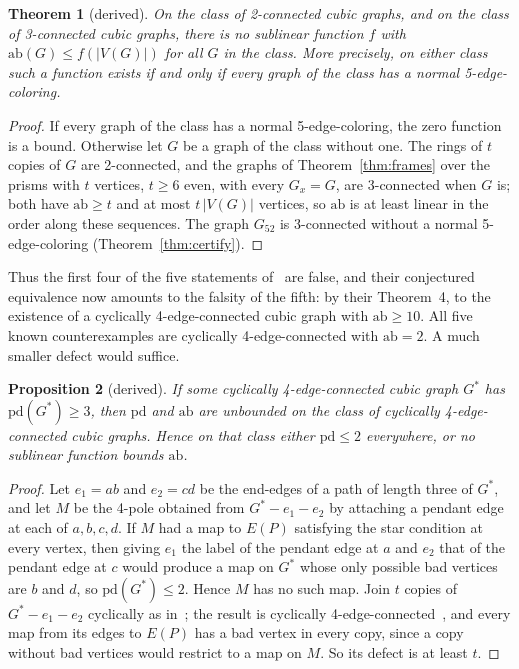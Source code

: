 \documentclass[11pt]{article}
\newtheorem{theorem}{Theorem}[section]
\newtheorem{proposition}[theorem]{Proposition}
\theoremstyle{definition}
\theoremstyle{remark}
\newcommand{\PG}{P}
\newcommand{\Gfty}{G_{52}}
\newcommand{\pd}{\mathrm{pd}}
\newcommand{\ab}{\mathrm{ab}}
\begin{document}
\begin{theorem}[derived]\label{thm:sublinear}
On the class of 2-connected cubic graphs, and on the class of 3-connected cubic graphs, there is
no sublinear function $f$ with $\ab(G) \le f(|V(G)|)$ for all $G$ in the class. More precisely, on
either class such a function exists if and only if every graph of the class has a normal
5-edge-coloring.
\end{theorem}

\begin{proof}
If every graph of the class has a normal 5-edge-coloring, the zero function is a bound. Otherwise
let $G$ be a graph of the class without one. The rings of $t$ copies of $G$ are 2-connected, and
the graphs of Theorem~\ref{thm:frames} over the prisms with $t$ vertices, $t \ge 6$ even, with
every $G_x = G$, are 3-connected when $G$ is; both have $\ab \ge t$ and at most $t\,|V(G)|$
vertices, so $\ab$ is at least linear in the order along these sequences. The graph $\Gfty$ is
3-connected without a normal 5-edge-coloring (Theorem~\ref{thm:certify}).
\end{proof}

Thus the first four of the five statements of~\cite{MMM2021} are false, and their conjectured
equivalence now amounts to the falsity of the fifth: by their Theorem~4, to the existence of a
cyclically 4-edge-connected cubic graph with $\ab \ge 10$. All five known counterexamples are
cyclically 4-edge-connected with $\ab = 2$. A much smaller defect would suffice.

\begin{proposition}[derived]\label{prop:threshold}
If some cyclically 4-edge-connected cubic graph $G^*$ has $\pd(G^*) \ge 3$, then $\pd$ and $\ab$
are unbounded on the class of cyclically 4-edge-connected cubic graphs. Hence on that class either
$\pd \le 2$ everywhere, or no sublinear function bounds $\ab$.
\end{proposition}

\begin{proof}
Let $e_1 = ab$ and $e_2 = cd$ be the end-edges of a path of length three of $G^*$, and let $M$ be
the 4-pole obtained from $G^* - e_1 - e_2$ by attaching a pendant edge at each of $a, b, c, d$.
If $M$ had a map to $E(\PG)$ satisfying the star condition at every vertex, then giving $e_1$ the
label of the pendant edge at $a$ and $e_2$ that of the pendant edge at $c$ would produce a map on
$G^*$ whose only possible bad vertices are $b$ and $d$, so $\pd(G^*) \le 2$. Hence $M$ has no such
map. Join $t$ copies of $G^* - e_1 - e_2$ cyclically as in~\cite{MMM2021}; the result is
cyclically 4-edge-connected~\cite[Proposition~2]{MMM2021}, and every map from its edges to
$E(\PG)$ has a bad vertex in every copy, since a copy without bad vertices would restrict to a map
on $M$. So its defect is at least $t$.
\end{proof}
\end{document}
